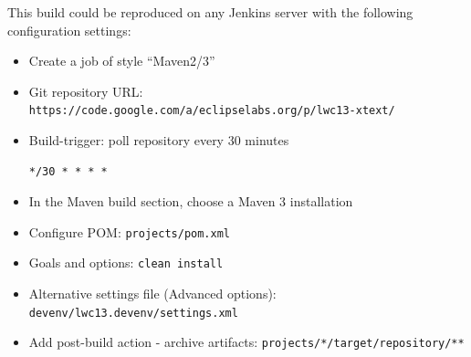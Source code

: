 This build could be reproduced on any Jenkins server with the following
configuration settings:
\begin{itemize}
  \item Create a job of style ``Maven2/3''
  \item Git repository URL:\newline
  \texttt{https://code.google.com/a/eclipselabs.org/p/lwc13-xtext/}
  \item Build-trigger: poll repository every 30 minutes
\begin{lstlisting}
*/30 * * * *
\end{lstlisting}
  \item In the Maven build section, choose a Maven 3 installation
  \item Configure POM: \texttt{projects/pom.xml}
  \item Goals and options: \texttt{clean install}
  \item Alternative settings file (Advanced options): \texttt{devenv/lwc13.devenv/settings.xml}
  \item Add post-build action - archive artifacts:
  \texttt{projects/*/target/repository/**}
\end{itemize}

